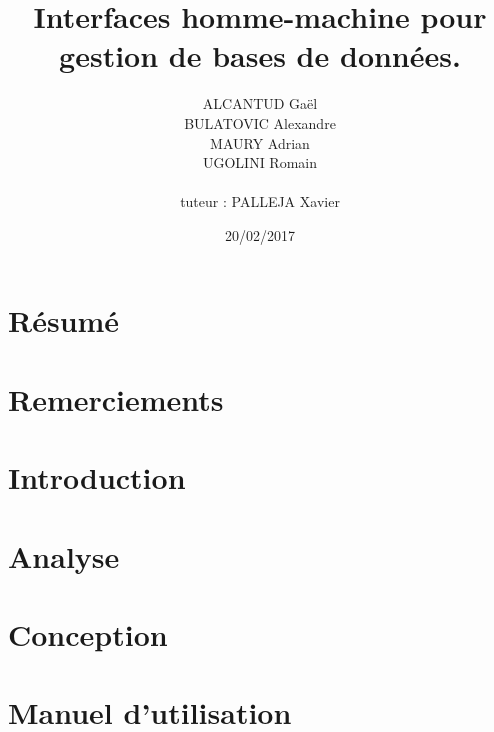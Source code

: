 \documentclass[12pt, a4paper, twoside, openright]{book}
\title{Interfaces homme-machine pour gestion de bases de données.}
\author{ALCANTUD Gaël \\ BULATOVIC Alexandre \\ MAURY Adrian \\ UGOLINI Romain \\ \\tuteur : PALLEJA Xavier}
\date{20/02/2017}
\begin{document}
\frontmatter
\maketitle

\thispagestyle{empty}
\chapter*{Résumé}


\thispagestyle{empty}
\chapter*{Remerciements}


\tableofcontents
\listoffigures
\printglossaries

\mainmatter
\chapter{Introduction}


\chapter{Analyse}


\chapter{Conception}


\chapter{Manuel d'utilisation}


\backmatter
\end{document}
